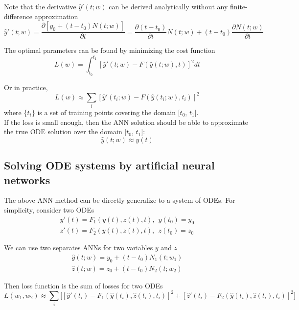 \documentclass[11pt]{article}
\newcommand{\ann}{artificial neural network}
\begin{document}
Note that the derivative $\hat{y}'(t; w)$ can be derived analytically without any finite-difference approximation
\begin{equation}
\hat{y}'(t; w)
= \frac{\partial[y_0+(t-t_0) N(t; w)]}{\partial t}
= \frac{\partial(t-t_0)}{\partial t}N(t; w) + (t-t_0)\frac{\partial N(t; w)}{\partial t}
\end{equation}

The optimal parameters can be found by minimizing the cost function
\begin{equation}
L(w) = \int_{t_0}^{t_1} [ \hat{y}'(t; w) - F(\hat{y}(t; w), t) ] ^ 2 dt
\end{equation}

Or in practice, 
\begin{equation}
L(w) \approx \sum_i [ \hat{y}'(t_i; w) - F(\hat{y}(t_i; w), t_i) ] ^ 2
\end{equation}
where \{$t_i$\} is a set of training points covering the domain [$t_0$, $t_1$].
\\

If the loss is small enough, then the ANN solution should be able to approximate the true ODE solution over the domain [$t_0$, $t_1$]:
\begin{equation}
\hat{y}(t; w) \approx y(t)
\end{equation}

\subsection{Solving ODE systems by \ann s}

The above ANN method can be directly generalize to a system of ODEs. For simplicity, consider two ODEs
\begin{align}
y'(t) = F_1(y(t), z(t), t), \ \ y(t_0)=y_0 \\
z'(t) = F_2(y(t), z(t), t), \ \ z(t_0)=z_0
\end{align}

We can use two separates ANNs for two variables $y$ and $z$
\begin{align}
\hat{y}(t; w) = y_0 + (t-t_0) N_1(t; w_1) \\
\hat{z}(t; w) = z_0 + (t-t_0) N_2(t; w_2)
\end{align}

Then loss function is the sum of losses for two ODEs
\begin{equation}
L(w_1, w_2) \approx \sum_i
\Big[
[\hat y'(t_i) - F_1(\hat y(t_i), \hat z(t_i), t_i)]^2
+
[\hat z'(t_i) - F_2(\hat y(t_i), \hat z(t_i), t_i)]^2
\Big]
\end{equation}
\end{document}
